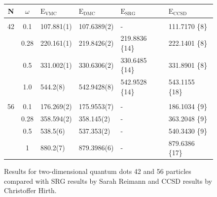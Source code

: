\begin{frame}

\begin{figure}
 \begin{center}
 \footnotesize
 \begin{tabular}{cc|llll}
 N      &  $\omega$ & $\mathrm{E_{VMC}}$ & $\mathrm{E_{DMC}}$ & $\mathrm{E_{SRG}}$ & $\mathrm{E_{CCSD}}$\\
\hline\hline
\multicolumn{6}{c}{} \\
    42    &   0.1    & 107.881(1)  & 107.6389(2) &- 			& 111.7170 \{8\} \\
          &   0.28   & 220.161(1)  & 219.8426(2) &219.8836 \{14\}	& 222.1401 \{8\} \\
          &   0.5    & 331.002(1)  & 330.6306(2) &330.6485 \{14\}	& 331.8901 \{8\} \\
          &   1.0    & 544.2(8)    & 542.9428(8) &542.9528 \{14\}	& 543.1155 \{18\}\\
\cline{2-6}
\multicolumn{6}{c}{} \\
    56    &   0.1    & 176.269(2) & 175.9553(7)  & -		& 186.1034 \{9\} \\
          &   0.28   & 358.594(2) & 358.145(2)   & -		& 363.2048 \{9\} \\
          &   0.5    & 538.5(6)   & 537.353(2)   & -		& 540.3430 \{9\} \\
          &   1      & 880.2(7)   & 879.3986(6)  & -		& 879.6386 \{17\}\\
\cline{2-6}
 \end{tabular}  
 \end{center}
  \caption{Results for two-dimensional quantum dots 42 and 56 particles compared with SRG results by Sarah Reimann and CCSD results by Christoffer Hirth.}
\end{figure}
\end{frame}

\normalsize

